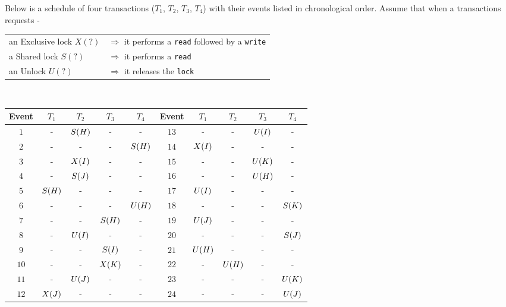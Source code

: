 
\usetikzlibrary{arrows}


\question Below is a schedule of four transactions ($T_1$, $T_2$, 
$T_3$, $T_4$) with their events listed in chronological order. 
Assume that when a transactions requests -\\
\watchout
\begin{tabular}{ll}
an Exclusive lock $X(?)$ &$\Rightarrow$ it performs a \texttt{read} followed by a \texttt{write} \\
a  Shared lock $S(?)$    &$\Rightarrow$ it performs a \texttt{read} \\
an Unlock $U(?)$         &$\Rightarrow$ it releases the \texttt{lock} \\
\end{tabular}
\\
\begin{tabular}{|c|c|c|c|c||c|c|c|c|c|}
  \hline
  Event & $T_1$ & $T_2$ & $T_3$ & $T_4$ &Event & $T_1$ & $T_2$ & $T_3$ & $T_4$ \\
  \hline
  $1$   & -       & $S(H)$& -       & -       &$13$  & -       & -       & $U(I)$& -       \\
  $2$   & -       & -       & -       & $S(H)$&$14$  & $X(I)$& -       & -       & -       \\
  $3$   & -       & $X(I)$& -       & -       &$15$  & -       & -       & $U(K)$& -       \\
  $4$   & -       & $S(J)$& -       & -       &$16$  & -       & -       & $U(H)$& -       \\
  $5$   & $S(H)$& -       & -       & -       &$17$  & $U(I)$& -       & -       & -       \\
  $6$   & -       & -       & -       & $U(H)$&$18$  & -       & -       & -       & $S(K)$\\
  $7$   & -       & -       & $S(H)$& -       &$19$  & $U(J)$& -       & -       & -       \\
  $8$   & -       & $U(I)$& -       & -       &$20$  & -       & -       & -       & $S(J)$\\
  $9$   & -       & -       & $S(I)$& -       &$21$  & $U(H)$& -       & -       & -       \\
  $10$  & -       & -       & $X(K)$& -       &$22$  & -       & $U(H)$& -       & -       \\
  $11$  & -       & $U(J)$& -       & -       &$23$  & -       & -       & -       & $U(K)$\\
  $12$  & $X(J)$& -       & -       & -       &$24$  & -       & -       & -       & $U(J)$\\
  \hline
\end{tabular}
